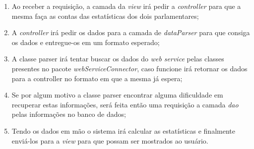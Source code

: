 		\begin{enumerate}
			\item Ao receber a requisição, a camada da \textit{view} irá pedir a \textit{controller} para que a mesma faça as contas das estatísticas dos dois parlamentares;

			\item A \textit{controller} irá pedir os dados para a camada de \textit{dataParser} para que consiga os dados e entregue-os em um formato esperado;

			\item A classe parser irá tentar buscar os dados do \textit{web service} pelas classes presentes no pacote \textit{webServiceConnector}, caso funcione irá retornar os dados para a controller no formato em que a mesma já espera;

			\item Se por algum motivo a classe parser encontrar alguma dificuldade em recuperar estas informações, será feita então uma requisição a camada \textit{dao} pelas informações no banco de dados;

			\item Tendo os dados em mão o sistema irá calcular as estatísticas e finalmente enviá-los para a \textit{view} para que possam ser mostrados ao usuário.
		\end{enumerate}